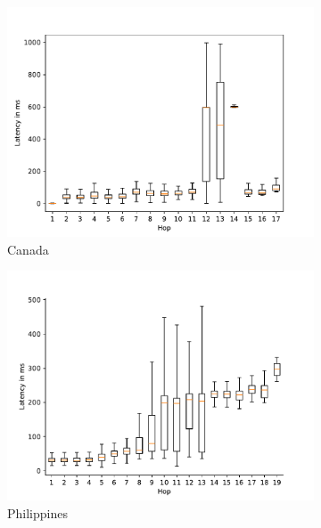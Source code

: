 \begin{figure}
	\centering
	\begin{subfigure}[b]{0.48\linewidth}
		\includegraphics[width=\linewidth]{chapters/4-results/traceroute/img/latency-per-hop-CA.pdf}
		\caption{Canada}
	\end{subfigure}
	\begin{subfigure}[b]{0.48\linewidth}
		\includegraphics[width=\linewidth]{chapters/4-results/traceroute/img/latency-per-hop-PH.pdf}
		\caption{Philippines}
	\end{subfigure}
	\begin{subfigure}[b]{0.48\linewidth}

\end{subfigure}
\end{figure}
